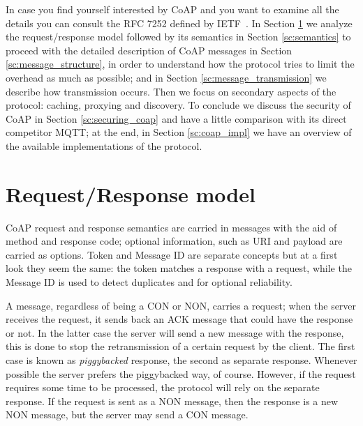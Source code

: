 	In case you find yourself interested by CoAP and you want to examine all the details you can consult
	the RFC 7252 defined by IETF~\cite{rfccoap}. \newline
	In Section \ref{sc:req_resp} we analyze the request/response model followed by its semantics in Section \ref{sc:semantics} to proceed with the detailed description of CoAP messages in Section \ref{sc:message_structure}, in order to understand how the protocol tries to limit the overhead as much as possible; and in Section \ref{sc:message_transmission} we describe how transmission occurs.\newline
	Then we focus on secondary aspects of the protocol: caching, proxying and discovery.\newline
	To conclude we discuss the security of CoAP in Section \ref{sc:securing_coap} and have a little comparison with its direct competitor MQTT; at the end, in Section \ref{sc:coap_impl} we have an overview of the available implementations of the protocol.\newline
	
	\section{Request/Response model}\label{sc:req_resp}
	CoAP request and response semantics are carried in messages with the aid of method and response code; optional information, such as URI and payload are carried as options.\newline
	Token and Message ID are separate concepts but at a first look they seem the same: the token matches a response
	with a request, while the Message ID is used to detect duplicates and for optional reliability.\newline
	
	A message, regardless of being a CON or NON, carries a request; when the server receives the request, it sends back an ACK message that could have the response or not. In the latter case the server will
	send a new message with the response, this is done to stop the retransmission of a certain request by the client.\newline
	The first case is known as \emph{piggybacked} response, the second as separate response. Whenever possible the server prefers the piggybacked way, of course. However, if the request requires some time to be processed, the protocol will rely on the separate response.\newline
	If the request is sent as a NON message, then the response is a new NON message, but the server may send a CON message.\newline
	
